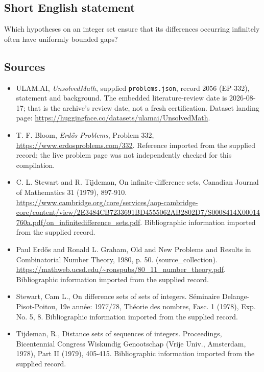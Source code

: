 \documentclass[11pt,a4paper]{article}
\begin{document}
\subsection{Short English statement}

Which hypotheses on an integer set ensure that its differences occurring infinitely often have uniformly bounded gaps?

\subsection{Sources}

{\small

\begin{itemize}

\item[\hypertarget{source:2056:1}{S1}] ULAM.AI, \emph{UnsolvedMath}, supplied \texttt{problems.json}, record 2056 (EP-332), statement and background. The embedded literature-review date is 2026-08-17; that is the archive’s review date, not a fresh certification. Dataset landing page: \url{https://huggingface.co/datasets/ulamai/UnsolvedMath}.

\item[\hypertarget{source:2056:2}{S2}] T. F. Bloom, \emph{Erdős Problems}, Problem 332, \url{https://www.erdosproblems.com/332}. Reference imported from the supplied record; the live problem page was not independently checked for this compilation.

\item[\hypertarget{source:2056:3}{S3}] C. L. Stewart and R. Tijdeman, On infinite-difference sets, Canadian Journal of Mathematics 31 (1979), 897-910. \url{https://www.cambridge.org/core/services/aop-cambridge-core/content/view/2E3484CB7233691BD4555062AB2802D7/S0008414X00014760a.pdf/on_infinitedifference_sets.pdf}. Bibliographic information imported from the supplied record.

\item[\hypertarget{source:2056:4}{S4}] Paul Erdős and Ronald L. Graham, Old and New Problems and Results in Combinatorial Number Theory, 1980, p. 50. (source\_collection). \url{https://mathweb.ucsd.edu/~ronspubs/80_11_number_theory.pdf}. Bibliographic information imported from the supplied record.

\item[\hypertarget{source:2056:5}{S5}] Stewart, Cam L., On difference sets of sets of integers. S\'{e}minaire Delange-Pisot-Poitou, 19e ann\'{e}e: 1977/78, Th\'{e}orie des nombres, Fasc. 1 (1978), Exp. No. 5, 8. Bibliographic information imported from the supplied record.

\item[\hypertarget{source:2056:6}{S6}] Tijdeman, R., Distance sets of sequences of integers. Proceedings, Bicentennial Congress Wiskundig Genootschap (Vrije Univ., Amsterdam, 1978), Part II (1979), 405-415. Bibliographic information imported from the supplied record.

\end{itemize}

}

\label{end:2056}
\end{document}
